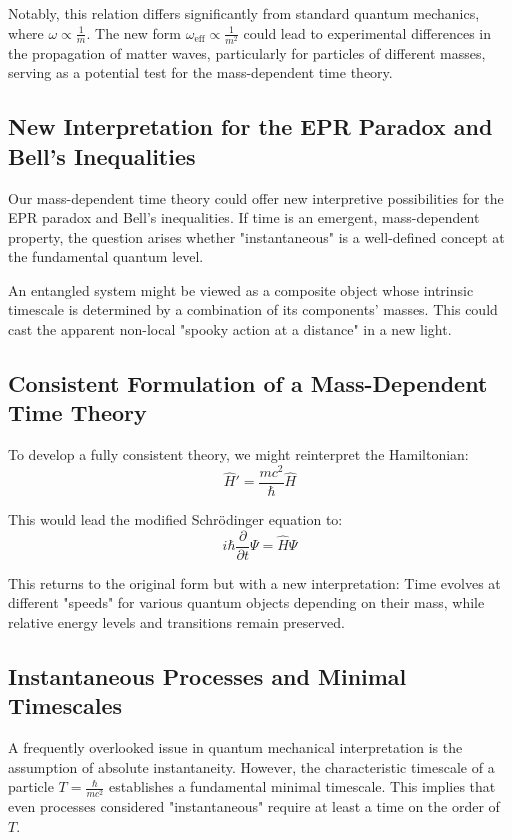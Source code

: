 \documentclass{article}
\begin{document}
	Notably, this relation differs significantly from standard quantum mechanics, where $\omega \propto \frac{1}{m}$. The new form $\omega_{\text{eff}} \propto \frac{1}{m^2}$ could lead to experimental differences in the propagation of matter waves, particularly for particles of different masses, serving as a potential test for the mass-dependent time theory.
	
	\subsection{New Interpretation for the EPR Paradox and Bell's Inequalities}
	
	Our mass-dependent time theory could offer new interpretive possibilities for the EPR paradox and Bell's inequalities. If time is an emergent, mass-dependent property, the question arises whether "instantaneous" is a well-defined concept at the fundamental quantum level.
	
	An entangled system might be viewed as a composite object whose intrinsic timescale is determined by a combination of its components' masses. This could cast the apparent non-local "spooky action at a distance" in a new light.
	
	\subsection{Consistent Formulation of a Mass-Dependent Time Theory}
	
	To develop a fully consistent theory, we might reinterpret the Hamiltonian:
	\begin{equation}
		\hat{H}' = \frac{mc^2}{\hbar} \hat{H}
	\end{equation}
	
	This would lead the modified Schrödinger equation to:
	\begin{equation}
		i\hbar \frac{\partial}{\partial t}\Psi = \hat{H}\Psi
	\end{equation}
	
	This returns to the original form but with a new interpretation: Time evolves at different "speeds" for various quantum objects depending on their mass, while relative energy levels and transitions remain preserved.
	
	\subsection{Instantaneous Processes and Minimal Timescales}
	
	A frequently overlooked issue in quantum mechanical interpretation is the assumption of absolute instantaneity. However, the characteristic timescale of a particle $T = \frac{\hbar}{mc^2}$ establishes a fundamental minimal timescale. This implies that even processes considered "instantaneous" require at least a time on the order of $T$.
	
\end{document}
